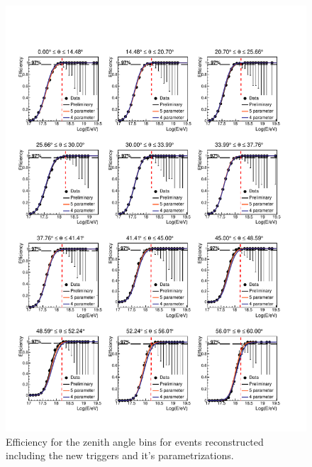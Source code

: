 \documentclass[12pt,a4paper]{article}
\begin{document}
\begin{figure}[p]
    \begin{center}
        \includegraphics[height=0.97\textheight]{plots/EfficiencyZenithNew.pdf}
        \caption{Efficiency for the zenith angle bins for events reconstructed including the new triggers and it's parametrizations.
        \label{fig:zenithNew}}
    \end{center}
\end{figure}
\end{document}
